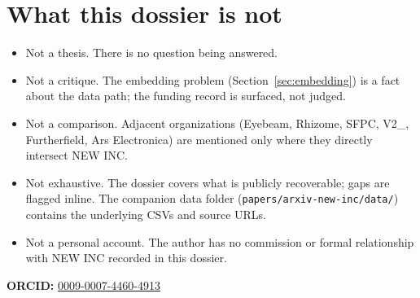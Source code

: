 \documentclass[10pt,letterpaper,twocolumn]{article}
\begin{document}
\section{What this dossier is not}

\begin{itemize}
  \item Not a thesis. There is no question being answered.
  \item Not a critique. The embedding problem (Section~\ref{sec:embedding}) is a fact about the data path; the funding record is surfaced, not judged.
  \item Not a comparison. Adjacent organizations (Eyebeam, Rhizome, SFPC, V2\_, Furtherfield, Ars Electronica) are mentioned only where they directly intersect NEW INC.
  \item Not exhaustive. The dossier covers what is publicly recoverable; gaps are flagged inline. The companion data folder (\texttt{papers/arxiv-new-inc/data/}) contains the underlying CSVs and source URLs.
  \item Not a personal account. The author has no commission or formal relationship with NEW INC recorded in this dossier.
\end{itemize}

\vspace{0.5em}
\noindent\textbf{ORCID:} \href{https://orcid.org/0009-0007-4460-4913}{0009-0007-4460-4913}



\end{document}
